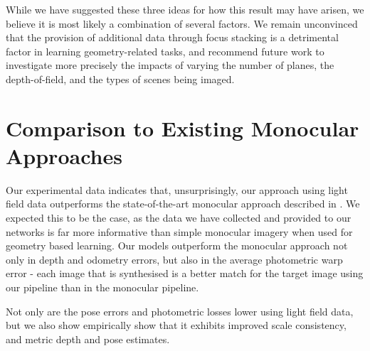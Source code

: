 While we have suggested these three ideas for how this result may have arisen, we believe it is most likely a combination of several factors. We remain unconvinced that the provision of additional data through focus stacking is a detrimental factor in learning geometry-related tasks, and recommend future work to investigate more precisely the impacts of varying the number of planes, the depth-of-field, and the types of scenes being imaged.

\section{Comparison to Existing Monocular Approaches}

Our experimental data indicates that, unsurprisingly, our approach using light field data outperforms the state-of-the-art monocular approach described in \cite{zhou2017unsupervised}. We expected this to be the case, as the data we have collected and provided to our networks is far more informative than simple monocular imagery when used for geometry based learning. Our models outperform the monocular approach not only in depth and odometry errors, but also in the average photometric warp error - each image that is synthesised is a better match for the target image using our pipeline than in the monocular pipeline. 

Not only are the pose errors and photometric losses lower using light field data, but we also show empirically show that it exhibits improved scale consistency, and metric depth and pose estimates.
